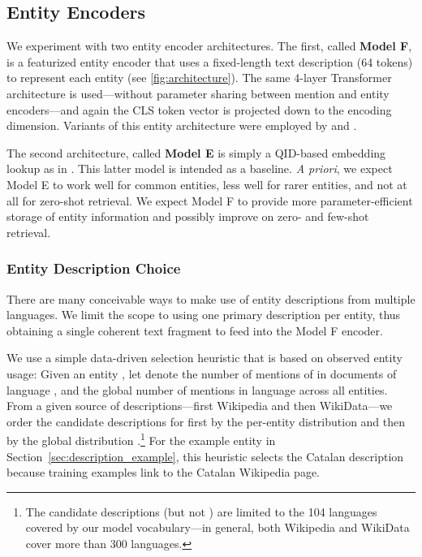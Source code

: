 \documentclass[11pt,a4paper]{article}
\begin{document}
\subsection{Entity Encoders}
We experiment with two entity encoder architectures. The first, called \textbf{Model F}, is a featurized entity encoder that uses a fixed-length text description (64 tokens) to represent each entity (see \autoref{fig:architecture}). The same 4-layer Transformer architecture is used---without parameter sharing between mention and entity encoders---and again the CLS token vector is projected down to the encoding dimension. Variants of this entity architecture were employed by  and .

The second architecture, called \textbf{Model E} is simply a QID-based embedding lookup as in .
This latter model is intended as a baseline. \emph{A priori}, we expect Model E to work well for common entities, less well for rarer entities, and not at all for zero-shot retrieval. We expect Model F to provide more parameter-efficient storage of entity information and possibly improve on zero- and few-shot retrieval. 


\subsubsection{Entity Description Choice}\label{sec:description_heuristic}
There are many conceivable ways to make use of entity descriptions from multiple languages.
We limit the scope to using one primary description per entity, thus obtaining a single coherent text fragment to feed into the Model F encoder.

We use a simple data-driven selection heuristic that is based on observed entity usage:
Given an entity ,
let  denote the number of mentions of  in documents of language ,
and  the global number of mentions in language  across all entities.
From a given source of descriptions---first Wikipedia and then WikiData---we order the candidate descriptions  for   first by the per-entity distribution  and then by the global distribution .\footnote{The candidate descriptions (but not ) are limited to the 104 languages covered by our model vocabulary---in general, both Wikipedia and WikiData cover more than 300 languages.} For the example entity in Section~\ref{sec:description_example}, this heuristic selects the Catalan description because  training examples link to the Catalan Wikipedia page.
\end{document}
